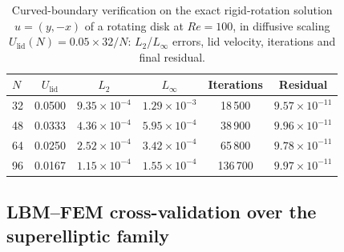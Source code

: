 \documentclass[11pt]{article}
\begin{document}
\begin{table}[H]
\centering
\caption{Curved-boundary verification on the exact rigid-rotation solution
$u=(y,-x)$ of a rotating disk at $Re=100$, in diffusive scaling
$U_{\mathrm{lid}}(N)=0.05\times32/N$: $L_2$/$L_\infty$ errors, lid velocity,
iterations and final residual.}




\label{tab:rotation}
\begin{tabular}{@{}lccccc@{}}
\toprule
$N$ & $U_{\mathrm{lid}}$ & $L_2$ & $L_\infty$ & Iterations & Residual \\
\midrule
32 & 0.0500 & $9.35\times10^{-4}$ & $1.29\times10^{-3}$ & 18\,500 & $9.57\times10^{-11}$ \\
48 & 0.0333 & $4.36\times10^{-4}$ & $5.95\times10^{-4}$ & 38\,900 & $9.96\times10^{-11}$ \\
64 & 0.0250 & $2.52\times10^{-4}$ & $3.42\times10^{-4}$ & 65\,800 & $9.78\times10^{-11}$ \\
96 & 0.0167 & $1.15\times10^{-4}$ & $1.55\times10^{-4}$ & 136\,700 & $9.97\times10^{-11}$ \\
\bottomrule
\end{tabular}
\end{table}
\par

\subsection{LBM--FEM cross-validation over the superelliptic family}
\label{sec:solverc}
\end{document}
